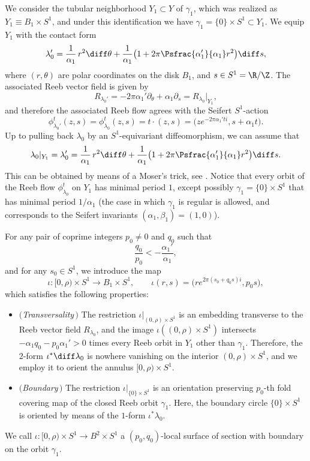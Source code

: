 We consider the tubular neighborhood $Y_1\subset Y$ of $\gamma_1$, which was realized as $Y_1\equiv B_1\times S^1$, and under this identification we have $\gamma_1=\{0\}\times S^1\subset Y_1$.
We equip $Y_1$ with the contact form
\[
\lambda_0' = \frac{1}{\alpha_1}\,r^2\diff\theta + \frac{1}{\alpha_1}\big(1+2\pi\Psfrac{\alpha'_1}{\alpha_1}r^2\big) \diff s,
\]
where $(r,\theta)$ are polar coordinates on the disk $B_1$, and $s\in S^1=\R/\Z$.
The associated Reeb vector field is given by
\[
R_{\lambda_0'} = -2\pi\alpha_1'\partial_\theta + \alpha_1\partial_s=R_{\lambda_0}|_{Y_1},
\]
and therefore the associated Reeb flow agrees with the Seifert $S^1$-action
\[
\phi_{\lambda_0'}^t(z,s)=\phi_{\lambda_0}^t(z,s)=t\cdot(z,s)=\big(z e^{-2\pi\alpha_1't i},s+\alpha_1 t\big).
\]
Up to pulling back $\lambda_0$ by an $S^1$-equivariant diffeomorphism, we can assume that
\[
\lambda_0|_{Y_1}=\lambda_0'=\frac{1}{\alpha_1}\,r^2\diff\theta + \frac{1}{\alpha_1}\big(1+2\pi\Psfrac{\alpha'_1}{\alpha_1}r^2\big) \diff s.
\]
This can be obtained by means of a Moser's trick, see \cite[Lem.\,4.5]{Cristofaro-Gardiner:2020aa}.
Notice that every orbit of the Reeb flow $\phi_{\lambda_0}^t$ on $Y_1$ has minimal period $1$, except possibly $\gamma_1=\{0\}\times S^1$ that has minimal period $1/\alpha_1$ (the case in which $\gamma_1$ is regular is allowed, and corresponds to the Seifert invariants $(\alpha_1,\beta_1)=(1,0)$).

For any pair of coprime integers $p_0\neq0$ and $q_0$ such that
\begin{equation}
\label{e:transversality}
\frac {q_0}{p_0}< -\frac{\alpha_1'}{\alpha_1},
\end{equation}
and for any $s_0\in S^1$, we introduce the map
\[
\iota:[0,\rho)\times S^1\to B_1\times S^1,\qquad \iota(r,s)=\big( r e^{2\pi (s_0+q_0 s)i},p_0s \big),
\]
which satisfies the following properties:
\begin{itemize}
\item \textit{$($Transversality$\,)$} The restriction $\iota|_{(0,\rho)\times S^1}$ is an embedding transverse to the Reeb vector field $R_{\lambda_0}$, and the image $\iota((0,\rho)\times S^1)$ intersects $-\alpha_1q_0-p_0\alpha_1'>0$ times every Reeb orbit in $Y_1$ other than $\gamma_1$. Therefore, the $2$-form $\iota^*\diff\lambda_0$ is nowhere vanishing on the interior $(0,\rho)\times S^1$, and we employ it to orient the annulus $[0,\rho)\times S^1$.\vspace{2pt}

\item \textit{$($Boundary$\,)$} The restriction $\iota|_{\{0\}\times S^1}$ is an orientation preserving $p_0$-th fold covering map of the closed Reeb orbit $\gamma_1$. Here, the boundary circle $\{0\}\times S^1$ is oriented by means of the $1$-form $\iota^*\lambda_0$.
\end{itemize}
We call $\iota:[0,\rho)\times S^1\to B^2\times S^1$ a $(p_0,q_0)$-local surface of section with boundary on the orbit $\gamma_1$.

